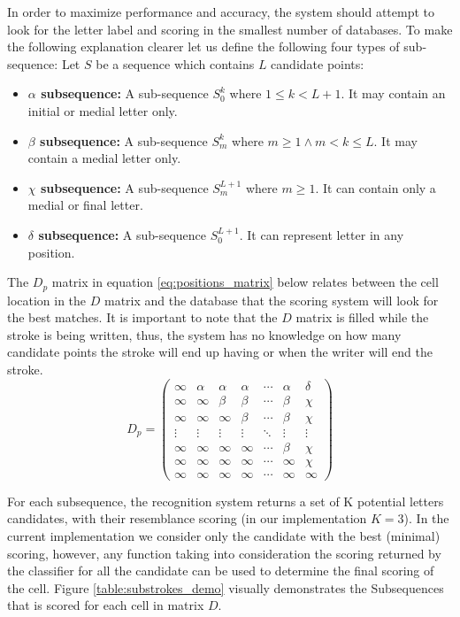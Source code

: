 \documentclass[journal,compsoc]{IEEEtran}
\begin{document}
In order to maximize performance and accuracy, the system should attempt to look for the letter label and scoring in the smallest number of databases. To make the following explanation clearer let us define the following four types of sub-sequence:
Let $S$ be a sequence which contains $L$ candidate points: 
\begin{itemize}
	\item \textbf{$\alpha$ subsequence:}  A sub-sequence $S_0^k$ where $ 1\leq k < L+1$. It may contain an initial or medial letter only.
	\item \textbf{$\beta$ subsequence:}  A sub-sequence $S_m^k$ where $m \geq 1 \wedge m< k \leq L$. It may contain a medial letter only.
	\item \textbf{$\chi$ subsequence:}  A sub-sequence $S_m^{L+1}$ where $m \geq 1$. It can contain only a medial or final letter.
	\item \textbf{$\delta$ subsequence:} A sub-sequence $S_0^{L+1}$. It can represent letter in any position.
\end{itemize}
The $D_p$ matrix in equation \ref{eq:positions_matrix} below relates between the cell location in the $D$ matrix and the database that the scoring system will look for the best matches. It is important to note that the $D$ matrix is filled while the stroke is being written, thus, the system has no knowledge on how many candidate points the stroke will end up having or when the writer will end the stroke. 
\begin{equation}
D_{p}=
\left( 
\begin{array}{ccccccc}
\infty 	& \alpha & \alpha & \alpha  & \cdots & \alpha & \delta \\
\infty  & \infty  & \beta   & \beta   & \cdots  & \beta  & \chi    \\
\infty  & \infty  & \infty   & \beta   & \cdots  & \beta  & \chi    \\
\vdots & \vdots & \vdots  & \vdots & \ddots  & \vdots & \vdots \\
\infty  & \infty  & \infty   & \infty   & \cdots  & \beta  & \chi    \\
\infty  & \infty  & \infty   & \infty   & \cdots  & \infty  & \chi    \\
\infty  & \infty  & \infty   & \infty   & \cdots  & \infty  & \infty \end{array} \right)
\label{eq:positions_matrix}
\end{equation}

For each subsequence, the recognition system returns a set of K potential letters candidates, with their resemblance scoring (in our implementation $K=3$). In the current implementation we consider only the candidate with the best (minimal) scoring, however, any function taking into consideration the scoring returned by the classifier for all the candidate can be used to determine the final scoring of the cell.
Figure \ref{table:substrokes_demo} visually demonstrates the Subsequences that is scored for each cell in matrix $D$.
\end{document}
